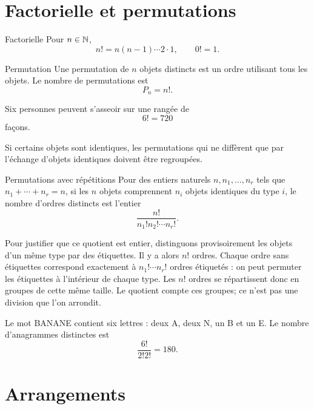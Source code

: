 \section{Factorielle et permutations}
\label{manual:section:07.02}

\begin{definition}{Factorielle}{}
Pour $n\in\mathbb{N}$,
\[
n!=n(n-1)\cdots2\cdot1,
\qquad 0!=1.
\]
\end{definition}

\begin{definition}{Permutation}{}
Une permutation de $n$ objets distincts est un ordre utilisant tous les objets. Le nombre de permutations est
\[
P_n=n!.
\]
\end{definition}

\begin{examplebox}
Six personnes peuvent s'asseoir sur une rangée de
\[
6!=720
\]
façons.
\end{examplebox}

Si certains objets sont identiques, les permutations qui ne diffèrent que par l'échange d'objets identiques doivent être regroupées.

\begin{proposition}{Permutations avec répétitions}{}
Pour des entiers naturels $n,n_1,\ldots,n_r$ tels que $n_1+\cdots+n_r=n$, si les $n$ objets comprennent $n_i$ objets identiques du type $i$, le nombre d'ordres distincts est l'entier
\[
\frac{n!}{n_1!n_2!\cdots n_r!}.
\]
\end{proposition}

Pour justifier que ce quotient est entier, distinguons provisoirement les objets d'un même type par des étiquettes. Il y a alors $n!$ ordres. Chaque ordre sans étiquettes correspond exactement à $n_1!\cdots n_r!$ ordres étiquetés : on peut permuter les étiquettes à l'intérieur de chaque type. Les $n!$ ordres se répartissent donc en groupes de cette même taille. Le quotient compte ces groupes; ce n'est pas une division que l'on arrondit.

\begin{examplebox}
Le mot BANANE contient six lettres : deux A, deux N, un B et un E. Le nombre d'anagrammes distinctes est
\[
\frac{6!}{2!2!}=180.
\]
\end{examplebox}

\section{Arrangements}
\label{manual:section:07.03}

